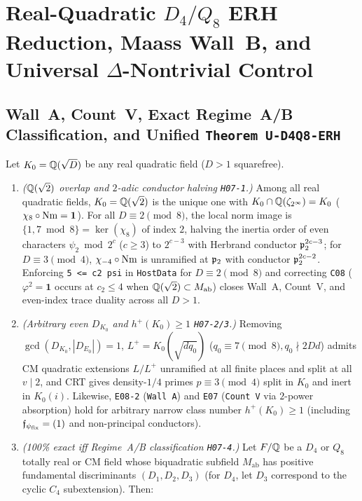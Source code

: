 \section{Real-Quadratic $D_4/Q_8$ ERH Reduction, Maass Wall~B, and Universal $\Delta$-Nontrivial Control}\label{sec:6:rq}

\subsection{Wall~A, Count~V, Exact Regime~A/B Classification, and Unified \texttt{Theorem U-D4Q8-ERH}}\label{sec:6:d4q8}

\begin{theorem}\label{thm:6:d4q8-prep}
\tagProved{}
Let $K_0 = \mathbb{Q}(\sqrt{D})$ be any real quadratic field ($D > 1$ squarefree).
\begin{enumerate}[label=\textup{(\roman*)}]
\item \emph{($\mathbb{Q}(\sqrt{2})$ overlap and $2$-adic conductor halving \texttt{H07-1}.)} Among all real quadratic fields, $K_0 = \mathbb{Q}(\sqrt{2})$ is the unique one with $K_0 \cap \mathbb{Q}(\zeta_{2^\infty}) = K_0$ ($\chi_8 \circ \operatorname{Nm} = \mathbf{1}$). For all $D \equiv 2 \pmod 8$, the local norm image is $\{1, 7 \bmod 8\} = \ker(\chi_8)$ of index $2$, halving the inertia order of even characters $\psi_2 \bmod 2^c$ ($c \ge 3$) to $2^{c-3}$ with Herbrand conductor $\mathfrak{p}_2^{2c-3}$; for $D \equiv 3 \pmod 4$, $\chi_{-4}\circ\operatorname{Nm}$ is unramified at $\mathfrak{p}_2$ with conductor $\mathfrak{p}_2^{2c-2}$. Enforcing \texttt{5 <= c2 psi} in \texttt{HostData} for $D \equiv 2 \pmod 8$ and correcting \texttt{C08} ($\varphi^2 = \mathbf{1}$ occurs at $c_2 \le 4$ when $\mathbb{Q}(\sqrt{2}) \subset M_{\mathrm{ab}}$) closes Wall~A, Count~V, and even-index trace duality across all $D > 1$.
\item \emph{(Arbitrary even $D_{K_0}$ and $h^+(K_0) \ge 1$ \texttt{H07-2/3}.)} Removing $\gcd(D_{K_0}, |D_{E_0}|) = 1$, $L^+ = K_0(\sqrt{d q_0})$ ($q_0 \equiv 7 \pmod 8, q_0 \nmid 2Dd$) admits CM quadratic extensions $L/L^+$ unramified at all finite places and split at all $v \mid 2$, and CRT gives density-$1/4$ primes $p \equiv 3 \pmod 4$ split in $K_0$ and inert in $K_0(i)$. Likewise, \texttt{E08-2} (\texttt{Wall A}) and \texttt{E07} (\texttt{Count V} via $2$-power absorption) hold for arbitrary narrow class number $h^+(K_0) \ge 1$ (including $\mathfrak{f}_{\psi_{\mathrm{fix}}} = (1)$ and non-principal conductors).
\item \emph{(100\% exact iff Regime~A/B classification \texttt{H07-4}.)} Let $F/\mathbb{Q}$ be a $D_4$ or $Q_8$ totally real or CM field whose biquadratic subfield $M_{\mathrm{ab}}$ has positive fundamental discriminants $(D_1, D_2, D_3)$ (for $D_4$, let $D_3$ correspond to the cyclic $C_4$ subextension). Then:

\end{enumerate}
\end{theorem}
